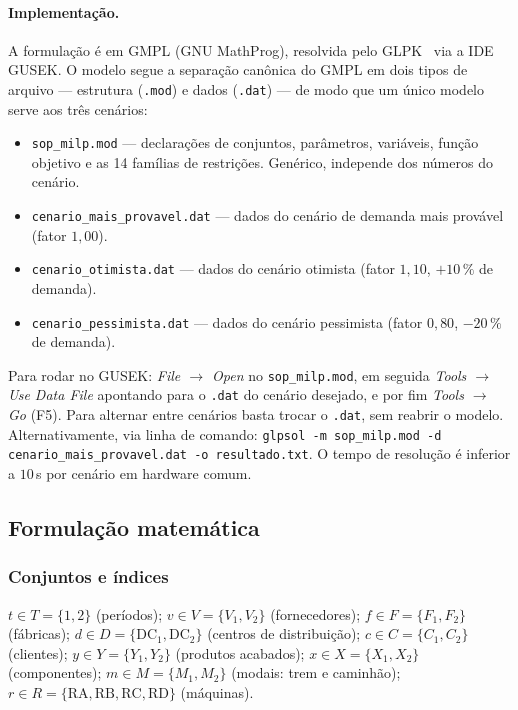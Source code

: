 \documentclass[11pt,a4paper]{article}
\begin{document}
\paragraph{Implementação.}
A formulação é em GMPL (GNU MathProg), resolvida pelo GLPK~\cite{makhorin2015glpk} via a IDE GUSEK. O modelo segue a separação canônica do GMPL em dois tipos de arquivo --- estrutura (\texttt{.mod}) e dados (\texttt{.dat}) --- de modo que um único modelo serve aos três cenários:
\begin{itemize}
  \item \texttt{sop\_milp.mod} --- declarações de conjuntos, parâmetros, variáveis, função objetivo e as 14 famílias de restrições. Genérico, independe dos números do cenário.
  \item \texttt{cenario\_mais\_provavel.dat} --- dados do cenário de demanda mais provável (fator $1{,}00$).
  \item \texttt{cenario\_otimista.dat} --- dados do cenário otimista (fator $1{,}10$, $+10\,\%$ de demanda).
  \item \texttt{cenario\_pessimista.dat} --- dados do cenário pessimista (fator $0{,}80$, $-20\,\%$ de demanda).
\end{itemize}
Para rodar no GUSEK: \emph{File $\to$ Open} no \texttt{sop\_milp.mod}, em seguida \emph{Tools $\to$ Use Data File} apontando para o \texttt{.dat} do cenário desejado, e por fim \emph{Tools $\to$ Go} (F5). Para alternar entre cenários basta trocar o \texttt{.dat}, sem reabrir o modelo. Alternativamente, via linha de comando: \texttt{glpsol -m sop\_milp.mod -d cenario\_mais\_provavel.dat -o resultado.txt}. O tempo de resolução é inferior a $10$\,s por cenário em hardware comum.

\subsection{Formulação matemática}

\subsubsection*{Conjuntos e índices}
$t \in T = \{1,2\}$ (períodos);
$v \in V = \{V_1, V_2\}$ (fornecedores);
$f \in F = \{F_1, F_2\}$ (fábricas);
$d \in D = \{\text{DC}_1, \text{DC}_2\}$ (centros de distribuição);
$c \in C = \{C_1, C_2\}$ (clientes);
$y \in Y = \{Y_1, Y_2\}$ (produtos acabados);
$x \in X = \{X_1, X_2\}$ (componentes);
$m \in M = \{M_1, M_2\}$ (modais: trem e caminhão);
$r \in R = \{\text{RA}, \text{RB}, \text{RC}, \text{RD}\}$ (máquinas).
\end{document}

